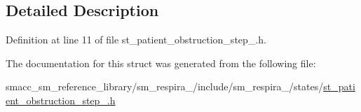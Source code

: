 \subsection{Detailed Description}


Definition at line 11 of file st\+\_\+patient\+\_\+obstruction\+\_\+step\+\_.\+h.



The documentation for this struct was generated from the following file\+:\begin{DoxyCompactItemize}
\item 
smacc\+\_\+sm\+\_\+reference\+\_\+library/sm\+\_\+respira\+\_/include/sm\+\_\+respira\+\_/states/\hyperlink{st__patient__obstruction__step__1_8h}{st\+\_\+patient\+\_\+obstruction\+\_\+step\+\_.\+h}\end{DoxyCompactItemize}
